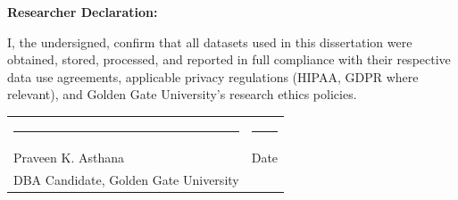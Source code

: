 \noindent\textbf{Researcher Declaration:}

\vspace{1em}
\noindent I, the undersigned, confirm that all datasets used in this dissertation were obtained, stored, processed, and reported in full compliance with their respective data use agreements, applicable privacy regulations (HIPAA, GDPR where relevant), and Golden Gate University's research ethics policies.

\vspace{2em}
\noindent\begin{tabular}{@{}p{6cm}p{6cm}@{}}
\rule{5cm}{0.4pt} & \rule{5cm}{0.4pt} \\
Praveen K. Asthana & Date \\
DBA Candidate, Golden Gate University & \\
\end{tabular}

